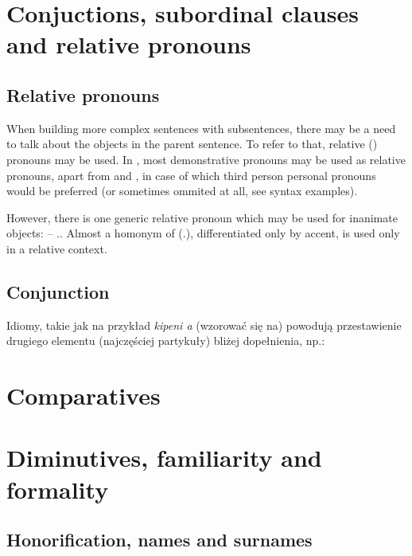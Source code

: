\section{Conjuctions, subordinal clauses and relative pronouns}
\label{sec:conjunctions}

\subsection{Relative pronouns}
When building more complex sentences with subsentences, there may be a need to
talk about the objects in the parent sentence. To refer to that, relative
(\Rel{}) pronouns may be used. In \andro, most demonstrative pronouns may be
used as relative pronouns, apart from  and , in case of
which third person personal pronouns would be preferred (or sometimes ommited at
all, see syntax examples).

However, there is one generic relative pronoun which may be used for inanimate
objects:  -- \Rel{}.\Inan{}. Almost a homonym of 
(\Tpl{}.\Inan{}), differentiated only by accent,  is used only in a
relative context.

\subsection{Conjunction }

Idiomy, takie jak na przykład \emph{kipeni a} (wzorować się na) powodują
przestawienie drugiego elementu (najczęściej partykuły) bliżej dopełnienia, np.:



\section{Comparatives}
\label{sec:comparatives}

\section{Diminutives, familiarity and formality}
\label{sec:diminutives}

\subsection{Honorification, names and surnames}


